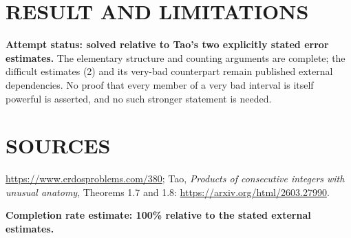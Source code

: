 \section{RESULT AND LIMITATIONS}
\textbf{Attempt status: solved relative to Tao's two explicitly stated error estimates.} The elementary structure and counting arguments are complete; the difficult estimates (2) and its very-bad counterpart remain published external dependencies. No proof that every member of a very bad interval is itself powerful is asserted, and no such stronger statement is needed.

\section{SOURCES}
\url{https://www.erdosproblems.com/380}; Tao, \emph{Products of consecutive integers with unusual anatomy}, Theorems 1.7 and 1.8: \url{https://arxiv.org/html/2603.27990}.

\textbf{Completion rate estimate: 100\% relative to the stated external estimates.}
